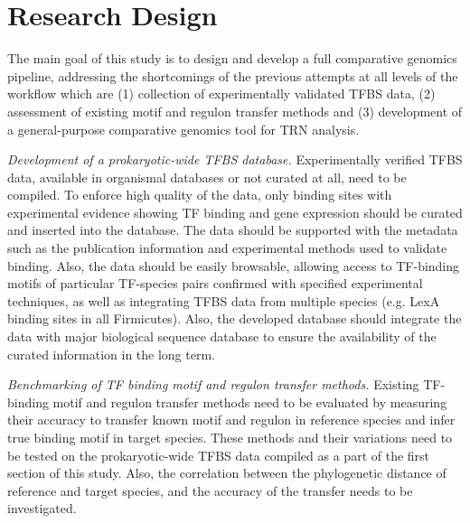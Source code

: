 \section{Research Design}

The main goal of this study is to design and develop a full comparative
genomics pipeline, addressing the shortcomings of the previous attempts at all
levels of the workflow which are (1) collection of experimentally validated
TFBS data, (2) assessment of existing motif and regulon transfer methods and
(3) development of a general-purpose comparative genomics tool for TRN
analysis.

\textit{Development of a prokaryotic-wide TFBS database.}
Experimentally verified TFBS data, available in organismal databases or not
curated at all, need to be compiled. To enforce high quality of the data, only
binding sites with experimental evidence showing TF binding and gene expression
should be curated and inserted into the database. The data should be supported
with the metadata such as the publication information and experimental methods
used to validate binding. Also, the data should be easily browsable, allowing
access to TF-binding motifs of particular TF-species pairs confirmed with
specified experimental techniques, as well as integrating TFBS data from
multiple species (e.g. LexA binding sites in all Firmicutes). Also, the
developed database should integrate the data with major biological sequence
database to ensure the availability of the curated information in the long
term.

\textit{Benchmarking of TF binding motif and regulon transfer methods.}
Existing TF-binding motif and regulon transfer methods need to be evaluated by
measuring their accuracy to transfer known motif and regulon in reference
species and infer true binding motif in target species. These methods and their
variations need to be tested on the prokaryotic-wide TFBS data compiled as a
part of the first section of this study. Also, the correlation between the
phylogenetic distance of reference and target species, and the accuracy of
the transfer needs to be investigated.

